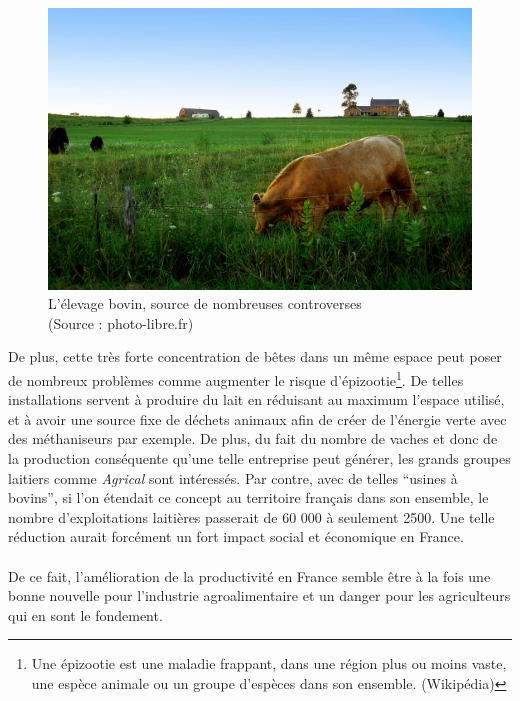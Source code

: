 \documentclass[a4paper,12pt]{report}
\begin{document}
			\begin{figure}[!h]
				\centering
				\includegraphics[scale=1]{Illustrations/Vache.jpg}
				\caption{L'élevage bovin, source de nombreuses controverses\\(Source : photo-libre.fr)}
				\label{Vache}
			\end{figure}
			
			 De plus, cette très forte concentration de bêtes dans un même espace peut poser de nombreux problèmes comme augmenter le risque d'épizootie\footnote{Une épizootie est une maladie frappant, dans une région plus ou moins vaste, une espèce animale ou un groupe d'espèces dans son ensemble. (Wikipédia)}. De telles installations servent à produire du lait en réduisant au maximum l’espace utilisé, et à avoir une source fixe de déchets animaux afin de créer de l’énergie verte avec des méthaniseurs par exemple. De plus, du fait du nombre de vaches et donc de la production conséquente qu’une telle entreprise peut générer, les grands groupes laitiers comme \textit{Agrical} sont intéressés. Par contre, avec de telles “usines à bovins”, si l’on étendait ce concept au territoire français dans son ensemble, le nombre d’exploitations laitières passerait de 60 000 à seulement 2500. Une telle réduction aurait forcément un fort impact social et économique en France.
			 
		\paragraph{}De ce fait, l'amélioration de la productivité en France semble être à la fois une bonne nouvelle pour l'industrie agroalimentaire et un danger pour les agriculteurs qui en sont le fondement.
			
\end{document}
